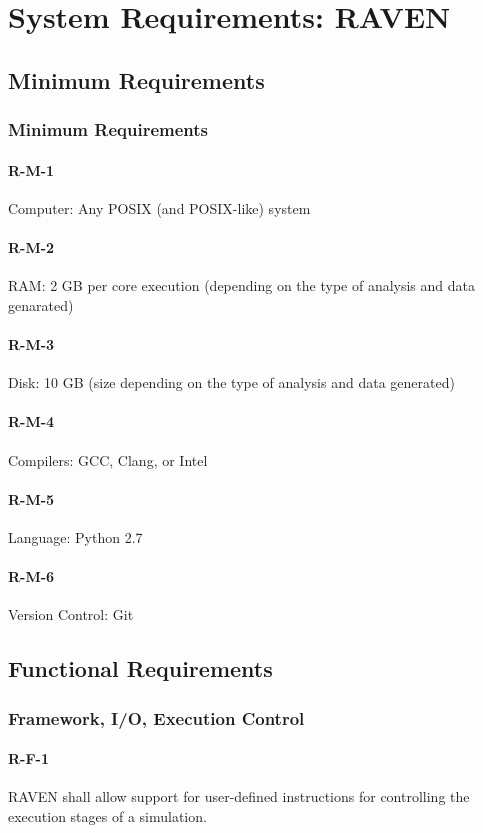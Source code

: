 \section{System Requirements: RAVEN}
\subsection{Minimum Requirements}
\subsubsection{Minimum Requirements}
\paragraph{R-M-1} 
Computer: Any POSIX (and POSIX-like) system
\paragraph{R-M-2} 
RAM: 2 GB per core execution (depending on the type of analysis and data genarated)
\paragraph{R-M-3} 
Disk: 10 GB (size depending on the type of analysis and data generated)
\paragraph{R-M-4} 
Compilers: GCC, Clang, or Intel
\paragraph{R-M-5} 
Language: Python 2.7
\paragraph{R-M-6} 
Version Control: Git
\subsection{Functional Requirements}
\subsubsection{Framework, I/O, Execution Control}
\paragraph{R-F-1} 
RAVEN shall allow support for user-defined instructions for controlling the execution stages of a simulation.
